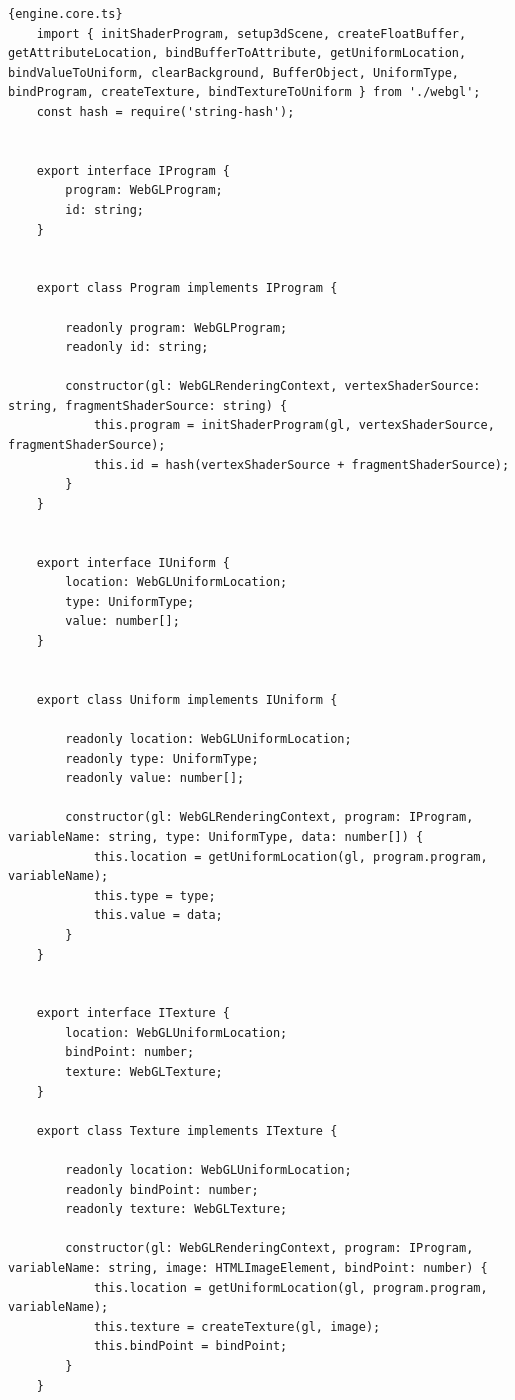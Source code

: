 \begin{lstlisting}{engine.core.ts}
    import { initShaderProgram, setup3dScene, createFloatBuffer, getAttributeLocation, bindBufferToAttribute, getUniformLocation, bindValueToUniform, clearBackground, BufferObject, UniformType, bindProgram, createTexture, bindTextureToUniform } from './webgl';
    const hash = require('string-hash');
    
    
    export interface IProgram {
        program: WebGLProgram;
        id: string;
    }
    
    
    export class Program implements IProgram {
    
        readonly program: WebGLProgram;
        readonly id: string;
    
        constructor(gl: WebGLRenderingContext, vertexShaderSource: string, fragmentShaderSource: string) {
            this.program = initShaderProgram(gl, vertexShaderSource, fragmentShaderSource);
            this.id = hash(vertexShaderSource + fragmentShaderSource);
        }
    }
    
    
    export interface IUniform {
        location: WebGLUniformLocation;
        type: UniformType;
        value: number[];
    }
    
    
    export class Uniform implements IUniform {
    
        readonly location: WebGLUniformLocation;
        readonly type: UniformType;
        readonly value: number[];
    
        constructor(gl: WebGLRenderingContext, program: IProgram, variableName: string, type: UniformType, data: number[]) {
            this.location = getUniformLocation(gl, program.program, variableName);
            this.type = type;
            this.value = data;
        }
    }
    
    
    export interface ITexture {
        location: WebGLUniformLocation;
        bindPoint: number;
        texture: WebGLTexture;
    }
    
    export class Texture implements ITexture {
    
        readonly location: WebGLUniformLocation;
        readonly bindPoint: number;
        readonly texture: WebGLTexture;
    
        constructor(gl: WebGLRenderingContext, program: IProgram, variableName: string, image: HTMLImageElement, bindPoint: number) {
            this.location = getUniformLocation(gl, program.program, variableName);
            this.texture = createTexture(gl, image);
            this.bindPoint = bindPoint;
        }
    }
    

\end{lstlisting}

